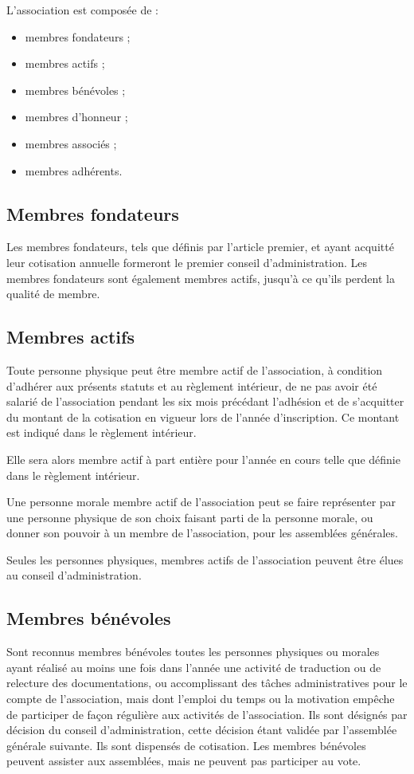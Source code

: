 \documentclass[a4wide,12pt]{scrartcl}
\begin{document}
L'association est composée de :
\begin{itemize}
\item membres fondateurs ;
\item membres actifs ;
\item membres bénévoles ;
\item membres d'honneur ;
\item membres associés ;
\item membres adhérents.
\end{itemize}

\subsection{Membres fondateurs}

Les membres fondateurs, tels que définis par l'article premier, et
ayant acquitté leur cotisation annuelle formeront le premier conseil
d'administration. Les membres fondateurs sont également membres
actifs, jusqu'à ce qu'ils perdent la qualité de membre.

\subsection{Membres actifs}

Toute personne physique peut être membre actif de l'association, à
condition d'adhérer aux présents statuts et au règlement intérieur, de
ne pas avoir été salarié de l'association pendant les six mois
précédant l'adhésion et de s'acquitter du montant de la cotisation en
vigueur lors de l'année d'inscription. Ce montant est indiqué dans le
règlement intérieur.

Elle sera alors membre actif à part entière pour l'année en cours
telle que définie dans le règlement intérieur.

Une personne morale membre actif de l'association peut se faire
représenter par une personne physique de son choix faisant parti de la
personne morale, ou donner son pouvoir à un membre de l'association,
pour les assemblées générales.

Seules les personnes physiques, membres actifs de l'association
peuvent être élues au conseil d'administration.

\subsection{Membres bénévoles}

Sont reconnus membres bénévoles toutes les personnes physiques ou
morales ayant réalisé au moins une fois dans l'année une activité de
traduction ou de relecture des documentations, ou accomplissant des
tâches administratives pour le compte de l'association, mais dont
l'emploi du temps ou la motivation empêche de participer de façon
régulière aux activités de l'association. Ils sont désignés par
décision du conseil d'administration, cette décision étant validée par
l'assemblée générale suivante. Ils sont dispensés de cotisation. Les
membres bénévoles peuvent assister aux assemblées, mais ne peuvent pas
participer au vote.
\end{document}
